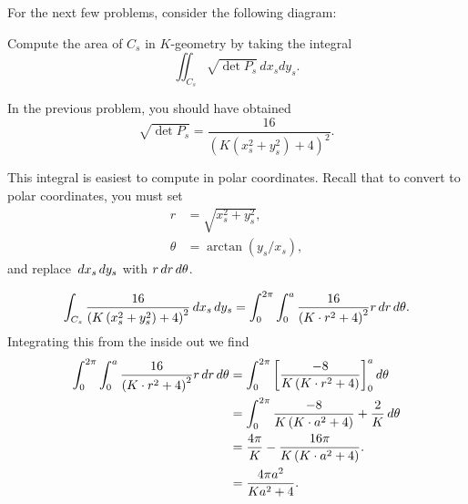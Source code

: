 \documentclass[newpage,handout,hints,12pt,noauthor,nooutcomes]{ximera}
\begin{document}
For the next few problems, consider the following diagram:
\begin{center}
\end{center}


\begin{problem}
  Compute the area of $C_s$ in $K$-geometry by taking the integral
  \[\iint_{C_s} \sqrt{\det P_s}\, dx_sdy_s.\]
  \begin{hint}
    In the previous problem, you should have obtained
    \[\sqrt{\det P_s}=\frac{16}{(K(x_s^2+y_s^2)+4)^2}.\]
  \end{hint}
  \begin{hint}
    This integral is easiest to compute in polar coordinates.  Recall that to
    convert to polar coordinates, you must set
    \begin{align*}
      r &= \sqrt{x_s^2+y_s^2},\\
      \theta &= \arctan(y_s/x_s),
    \end{align*}
    and replace $\,d x_s\,d y_s$ with $r\,d r\,d \theta$.
  \end{hint}
  \begin{freeResponse}
    \[
    \int_{C_s} \frac{16}{\left(K\left(x_s^2+y_s^2\right)+4\right)^2} \,d x_s\,d y_s
    =\int_0^{2\pi}\int_0^a \frac{16}{\left(K\cdot r^2+4\right)^2} r\,d r \,d \theta.
    \]
    Integrating this from the inside out we find
    \begin{align*}
      \int_0^{2\pi} \int_0^a \frac{16}{\left(K\cdot r^2+4\right)^2} r\,d r \,d \theta
      &= \int_0^{2\pi} \bigg[ \frac{-8}{K\left(K\cdot r^2+4\right)} \bigg]_0^a \,d \theta\\
      &= \int_0^{2\pi} \frac{-8}{K\left(K\cdot a^2+4\right)}+\frac{2}{K} \,d \theta\\
      &= \frac{4\pi}{K}-\frac{16\pi}{K\left(K\cdot a^2+4\right)}. \\
      &= \frac{4\pi a^2}{Ka^2+4}.
    \end{align*}
  \end{freeResponse}
\end{problem}
\end{document}
